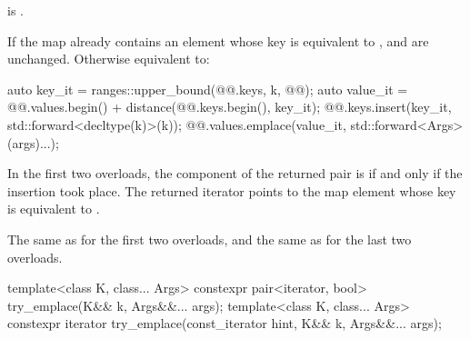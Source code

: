\begin{itemdescr}
\pnum
\constraints
{} is .

\pnum
\effects
If the map already contains an element whose key is equivalent to ,
 and  are unchanged.
Otherwise equivalent to:
\begin{codeblock}
auto key_it = ranges::upper_bound(@@.keys, k, @@);
auto value_it = @@.values.begin() + distance(@@.keys.begin(), key_it);
@@.keys.insert(key_it, std::forward<decltype(k)>(k));
@@.values.emplace(value_it, std::forward<Args>(args)...);
\end{codeblock}

\pnum
\returns
In the first two overloads,
the  component of the returned pair is 
if and only if the insertion took place.
The returned iterator points to the map element
whose key is equivalent to .

\pnum
\complexity
The same as  for the first two overloads, and
the same as  for the last two overloads.
\end{itemdescr}

%
\begin{itemdecl}
template<class K, class... Args>
  constexpr pair<iterator, bool> try_emplace(K&& k, Args&&... args);
template<class K, class... Args>
  constexpr iterator try_emplace(const_iterator hint, K&& k, Args&&... args);
\end{itemdecl}

